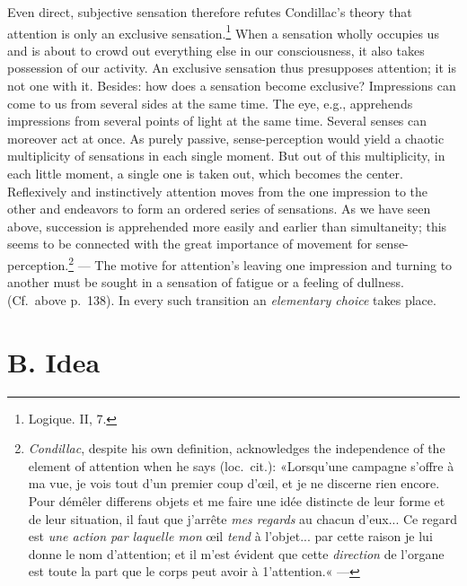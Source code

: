 \documentclass[12pt,a4paper]{book}
\newcommand{\opage}[1]{\marginnote{\footnotesize\textit{[#1]}}}
\begin{document}
Even direct, subjective sensation therefore refutes Condillac's theory
that attention is only an exclusive
sensation.\footnote{Logique. II, 7.} When a sensation wholly occupies us
and is about to crowd out everything else in our consciousness, it also
takes possession of our activity. An exclusive sensation thus
presupposes attention; it is not one with it. Besides: how does a
sensation become exclusive? Impressions can come to us from several
sides at the same time. The eye, e.g., apprehends impressions from
several points of light at the same time. Several senses can moreover
act at once. As purely passive, sense-perception would yield a chaotic
multiplicity of sensations in each single moment. But out of this
multiplicity, in each little moment, a single one is taken out, which
becomes the center. Reflexively and instinctively attention moves from
the one impression to the other and endeavors to form an ordered series
of sensations. As we have seen above, succession is apprehended more
easily and earlier than simultaneity; this seems to be connected with
the great importance of movement for
sense-perception.\footnote{\emph{Condillac}, despite his own
definition, acknowledges the independence of the element of attention
when he says (loc.\ cit.): «Lorsqu’une campagne s’offre à ma vue, je
vois tout d’un premier coup d’œil, et je ne discerne rien encore. Pour
démêler differens objets et me faire une idée distincte de leur forme et
de leur situation, il faut que j’arrête \emph{mes regards} au chacun
d’eux... Ce regard est \emph{une action par laquelle mon} œil
\emph{tend} à l’objet... par cette raison je lui donne le nom
d’attention; et il m’est évident que cette \emph{direction} de l’organe
est toute la part que le corps peut avoir à 1’attention.« ---} --- The
motive for attention's leaving one
\opage{150}impression and turning to another must be sought in a
sensation of fatigue or a feeling of dullness. (Cf.\ above p.~138).
In every such transition an \emph{elementary choice} takes place.


\section*{B. Idea}
\end{document}

